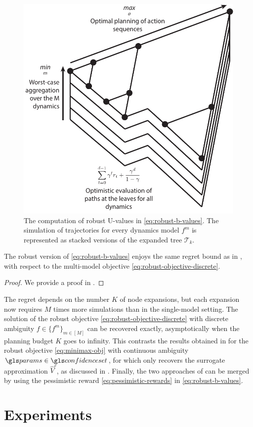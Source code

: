 \begin{figure}
	\centering
	\includegraphics[width=0.45\linewidth]{img/robust-control-tree}
	\caption{The computation of robust U-values in \eqref{eq:robust-b-values}. The simulation of trajectories for every dynamics model $f^m$ is represented as stacked versions of the expanded tree $\mathcal{T}_k$.}
	\label{fig:drop}
\end{figure}

\begin{theorem}
	\label{theorem:drop-regret}
	\begin{leftbar}[theorembar]
	The robust version of \OPD \eqref{eq:robust-b-values} enjoys the same regret bound as \OPD in , with respect to the multi-model objective \eqref{eq:robust-objective-discrete}.
	\end{leftbar}
\end{theorem}
\begin{proof}
	We provide a proof in .
\end{proof}

The regret depends on the number $K$ of node expansions, but each expansion now requires $M$ times more simulations than in the single-model setting. The solution of the robust objective \eqref{eq:robust-objective-discrete} with discrete ambiguity $f\in\{f^m\}_{m\in[M]}$ can be recovered exactly, asymptotically when the planning budget $K$ goes to infinity. This contrasts the results obtained in  for the robust objective \eqref{eq:minimax-obj} with continuous ambiguity $\params\in\confidenceset$, for which \OPD only recovers the surrogate approximation $\hat{V}^r$, as discussed in . Finally, the two approaches of  can be merged by using the pessimistic reward \eqref{eq:pessimistic-rewards} in \eqref{eq:robust-b-values}.

\section{Experiments}
\label{sec:interval-experiments}


